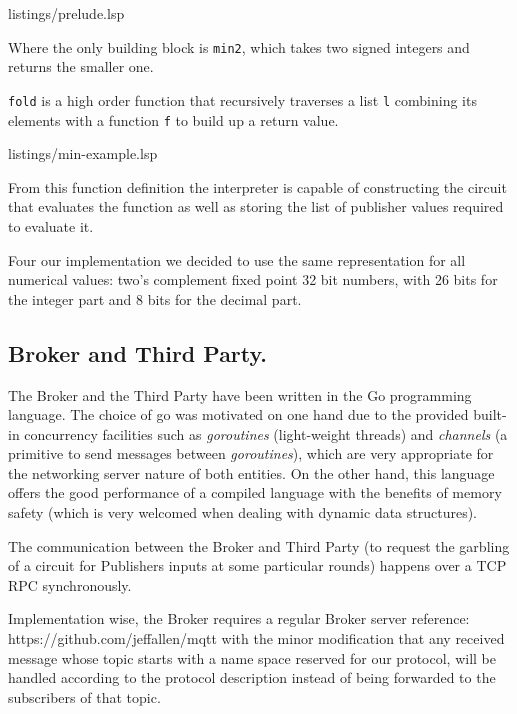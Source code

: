 \noindent
\begin{minipage}{\linewidth}

{listings/prelude.lsp}
\end{minipage}

Where the only \libgarble{} building block is \texttt{min2}, which takes two
signed integers and returns the smaller one.

\texttt{fold} is a high order function that recursively traverses a list
\texttt{l} combining its elements with a function \texttt{f} to build up a
return value.

\noindent
\begin{minipage}{\linewidth}

{listings/min-example.lsp}
\end{minipage}

From this function definition the interpreter is capable of constructing the
circuit that evaluates the function as well as storing the list of publisher
values required to evaluate it.

Four our implementation we decided to use the same representation for all
numerical values: two's complement fixed point 32 bit numbers, with 26 bits for
the integer part and 8 bits for the decimal part.

\subsection{Broker and Third Party.}

The Broker and the Third Party have been written in the Go programming
language.  The choice of go was motivated on one hand due to the provided
built-in concurrency facilities such as \emph{goroutines} (light-weight
threads) and \emph{channels} (a primitive to send messages between
\emph{goroutines}), which are very appropriate for the networking server nature
of both entities.  On the other hand, this language offers the good performance
of a compiled language with the benefits of memory safety (which is very
welcomed when dealing with dynamic data structures).

The communication between the Broker and Third Party (to request the garbling
of a circuit for Publishers inputs at some particular rounds) happens over a
TCP RPC synchronously.

Implementation wise, the Broker requires a regular \MQTT{} Broker server
{reference: https://github.com/jeffallen/mqtt} with the minor modification that
any received message whose topic starts with a name space reserved for our
protocol, will be handled according to the protocol description instead of
being forwarded to the subscribers of that topic.

